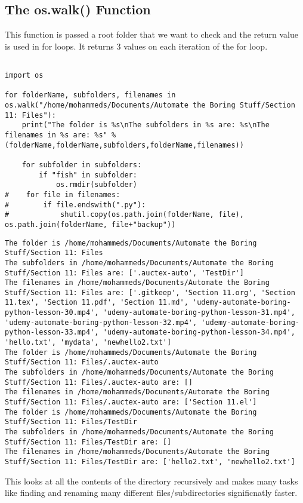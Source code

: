\documentclass[11pt]{article}
\begin{document}
\subsection{The os.walk() Function}
\label{sec:orgf7958bd}

This function is passed a root folder that we want to check and the return value is used in for loops. It returns 3 values on each iteration of the for loop.

\begin{verbatim}

import os

for folderName, subfolders, filenames in os.walk("/home/mohammeds/Documents/Automate the Boring Stuff/Section 11: Files"):
    print("The folder is %s\nThe subfolders in %s are: %s\nThe filenames in %s are: %s" % (folderName,folderName,subfolders,folderName,filenames))

    for subfolder in subfolders:
        if "fish" in subfolder:
            os.rmdir(subfolder)
#    for file in filenames:
#        if file.endswith(".py"):
#            shutil.copy(os.path.join(folderName, file), os.path.join(folderName, file+"backup"))

\end{verbatim}

\begin{verbatim}
The folder is /home/mohammeds/Documents/Automate the Boring Stuff/Section 11: Files
The subfolders in /home/mohammeds/Documents/Automate the Boring Stuff/Section 11: Files are: ['.auctex-auto', 'TestDir']
The filenames in /home/mohammeds/Documents/Automate the Boring Stuff/Section 11: Files are: ['.gitkeep', 'Section 11.org', 'Section 11.tex', 'Section 11.pdf', 'Section 11.md', 'udemy-automate-boring-python-lesson-30.mp4', 'udemy-automate-boring-python-lesson-31.mp4', 'udemy-automate-boring-python-lesson-32.mp4', 'udemy-automate-boring-python-lesson-33.mp4', 'udemy-automate-boring-python-lesson-34.mp4', 'hello.txt', 'mydata', 'newhello2.txt']
The folder is /home/mohammeds/Documents/Automate the Boring Stuff/Section 11: Files/.auctex-auto
The subfolders in /home/mohammeds/Documents/Automate the Boring Stuff/Section 11: Files/.auctex-auto are: []
The filenames in /home/mohammeds/Documents/Automate the Boring Stuff/Section 11: Files/.auctex-auto are: ['Section 11.el']
The folder is /home/mohammeds/Documents/Automate the Boring Stuff/Section 11: Files/TestDir
The subfolders in /home/mohammeds/Documents/Automate the Boring Stuff/Section 11: Files/TestDir are: []
The filenames in /home/mohammeds/Documents/Automate the Boring Stuff/Section 11: Files/TestDir are: ['hello2.txt', 'newhello2.txt']
\end{verbatim}


This looks at all the contents of the directory recursively and makes many tasks like finding and renaming many different files/subdirectories significnatly faster.
\end{document}
